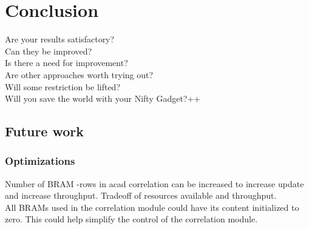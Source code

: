 \newpage
\chapter{Conclusion}
\label{sec:conclusion}



Are your results satisfactory?\\
Can they be improved?\\
Is there a need for improvement?\\
Are other approaches worth trying out?\\
Will some restriction be lifted?\\
Will you save the world with your Nifty Gadget?++

\section{Future work}

\subsection{Optimizations}
Number of BRAM -rows in acad correlation can be increased to increase update and increase throughput. Tradeoff of resources available and throughput.
\\

All BRAMs used in the correlation module could have its content initialized to zero. This could help simplify the control of the correlation module.